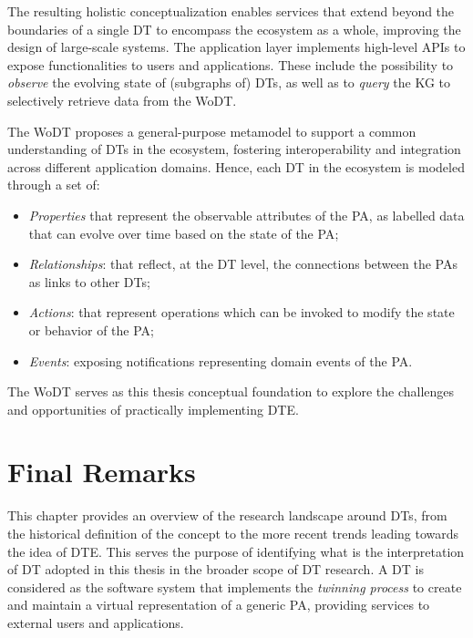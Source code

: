 The resulting holistic conceptualization enables services that extend beyond the boundaries of a single \ac{DT} to encompass the ecosystem as a whole, improving the design of large-scale systems.
%
The application layer implements high-level \acp{API} to expose functionalities to users and applications.
%
These include the possibility to \emph{observe} the evolving state of (subgraphs of) \acp{DT}, as well as to \emph{query} the \ac{KG} to selectively retrieve data from the \ac{WoDT}. 

The \ac{WoDT} proposes a general-purpose metamodel to support a common understanding of \acp{DT} in the ecosystem, fostering interoperability and integration across different application domains.
Hence, each \ac{DT} in the ecosystem is modeled through a set of:
\begin{itemize}
    \item \textit{Properties} that represent the observable attributes of the \ac{PA}, as labelled data that can evolve over time based on the state of the \ac{PA};
    \item \textit{Relationships}: that reflect, at the \ac{DT} level, the connections between the \acp{PA} as links to other \acp{DT};
    \item \textit{Actions}: that represent operations which can be invoked to modify the state or behavior of the \ac{PA};
    \item \textit{Events}: exposing notifications representing domain events of the \ac{PA}.
\end{itemize}

The \ac{WoDT} serves as this thesis conceptual foundation to explore the challenges and opportunities of practically implementing \ac{DTE}. 


\section{Final Remarks}

This chapter provides an overview of the research landscape around \acp{DT}, from the historical definition of the concept to the more recent trends leading towards the idea of \ac{DTE}. 
%
This serves the purpose of identifying what is the interpretation of \ac{DT} adopted in this thesis in the broader scope of \ac{DT} research.
%
A \ac{DT} is considered as the software system that implements the \emph{twinning process} to create and maintain a virtual representation of a generic \ac{PA}, providing services to external users and applications.

